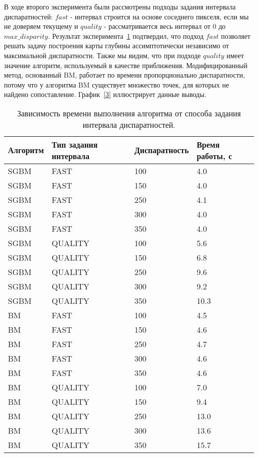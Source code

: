 В ходе второго эксперимента были рассмотрены подходы задания интервала диспаратностей: $fast$ - интервал строится на основе соседнего пикселя, если мы не доверяем текущему и $quality$ - рассматривается весь интервал от $0$ до $max\_disparity$. Результат эксперимента~\ref{2} подтвердил, что подход $fast$ позволяет решать задачу построения карты глубины ассимптотически независимо от максимальной диспаратности. Также мы видим, что при подходе $quality$  имеет значение алгоритм, используемый в качестве приближения. Модифицированный метод, основанный BM, работает по времени пропорционально диспаратности, потому что у алгоритма BM существует множество точек, для которых не найдено сопоставление. График~\ref{3} иллюстрирует данные выводы.


\begin{table}[h!]
   \caption{Зависимость времени выполнения алгоритма от способа задания интервала диспаратностей.}
    \label{2}
    \begin{tabular}{ | l | l | l | p{5cm} |}
    \hline
    Алгоритм & Тип задания интервала &  Диспаратность & Время работы, с \\ \hline
   
SGBM	& FAST	& 100	& 4.0	\\ \hline
SGBM	& FAST	& 150	& 4.0	\\ \hline
SGBM	& FAST	& 250	& 4.1	\\ \hline
SGBM	& FAST	& 300	& 4.0	\\ \hline
SGBM	& FAST	& 350	& 4.0	\\ \hline
SGBM	& QUALITY	& 100	& 5.6	\\ \hline
SGBM	& QUALITY	& 150	& 6.8	\\ \hline
SGBM	& QUALITY	& 250	& 9.6	\\ \hline
SGBM	& QUALITY	& 300	& 9.2	\\ \hline
SGBM	& QUALITY	& 350	& 10.3\\ \hline	
BM		& FAST	& 100	& 4.5	\\ \hline
BM		& FAST	& 150	& 4.6	\\ \hline
BM		& FAST	& 250	& 4.7	\\ \hline
BM		& FAST	& 300	& 4.6	\\ \hline
BM		& FAST	& 350	& 4.6	\\ \hline
BM		& QUALITY	& 100	& 7.0	\\ \hline
BM		& QUALITY	& 150	& 9.4	\\ \hline
BM		& QUALITY	& 250	& 13.0\\ \hline
BM		& QUALITY	& 300	& 13.6\\ \hline
BM		& QUALITY	& 350	& 15.7\\ 
    \hline
    \end{tabular}
\end{table}

